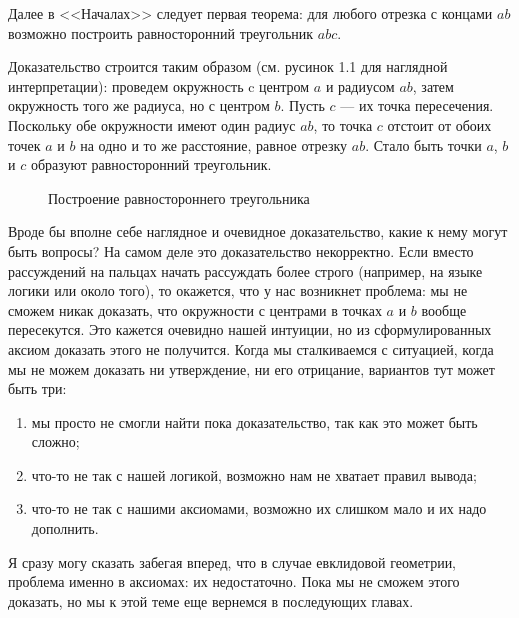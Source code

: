 Далее в <<Началах>> следует первая теорема: для любого отрезка с концами $ab$ возможно построить равносторонний треугольник $abc$.

Доказательство строится таким образом (см. русинок 1.1 для наглядной интерпретации): проведем окружность c центром $a$ и радиусом $ab$, затем окружность того же радиуса, но с центром $b$. Пусть $c$ --- их точка пересечения. Поскольку обе окружности имеют один радиус $ab$, то точка $c$ отстоит от обоих точек $a$ и $b$ на одно и то же расстояние, равное отрезку $ab$. Стало быть точки $a$, $b$ и $c$ образуют равносторонний треугольник.

\begin{figure}[h]
\centering
{}
\caption{Построение равностороннего треугольника}
\end{figure}

Вроде бы вполне себе наглядное и очевидное доказательство, какие к нему могут быть вопросы? На самом деле это доказательство некорректно. Если вместо рассуждений на пальцах начать рассуждать более строго (например, на языке логики или около того), то окажется, что у нас возникнет проблема: мы не сможем никак доказать, что окружности с центрами в точках $a$ и $b$ вообще пересекутся. Это кажется очевидно нашей интуиции, но из сформулированных аксиом доказать этого не получится. Когда мы сталкиваемся с ситуацией, когда мы не можем доказать ни утверждение, ни его отрицание, вариантов тут может быть три:

\begin{enumerate}
\item мы просто не смогли найти пока доказательство, так как это может быть сложно;
\item что-то не так с нашей логикой, возможно нам не хватает правил вывода;
\item что-то не так с нашими аксиомами, возможно их слишком мало и их надо дополнить.
\end{enumerate}

Я сразу могу сказать забегая вперед, что в случае евклидовой геометрии, проблема именно в аксиомах: их недостаточно. Пока мы не сможем этого доказать, но мы к этой теме еще вернемся в последующих главах.

